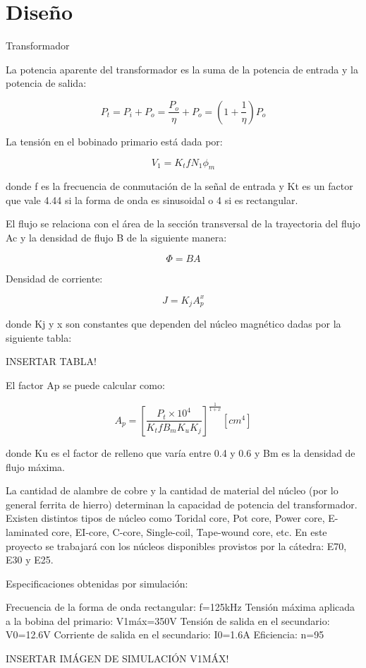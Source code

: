 \section{Diseño}

Transformador

La potencia aparente del transformador es la suma de la potencia de entrada y la potencia de salida:

$$ P_{t}=P_{i}+P_{o}=\frac{P_{o}}{\eta}+P_{o}=(1+\frac{1}{\eta})P_{o} $$

La tensión en el bobinado primario está dada por: 

$$ V_{1}=K_{t} f N_{1} \phi_{m} $$

donde f es la frecuencia de conmutación de la señal de entrada y 
Kt es un factor que vale 4.44 si la forma de onda es sinusoidal o 4 si es rectangular.

El flujo se relaciona con el área de la sección transversal de la trayectoria del flujo Ac y la densidad de flujo B de la siguiente manera:

$$ \Phi=BA $$

Densidad de corriente:

$$ J=K_{j} A_{p}^{x} $$

donde Kj y x son constantes que dependen del núcleo magnético dadas por la siguiente tabla:

INSERTAR TABLA!

El factor Ap se puede calcular como: 

$$ A_{p}=[\frac{P_{t} \times 10^{4}}{K_{t} f B_{m} K_{u} K_{j}}]^{\frac{1}{1+x}} [{cm}^{4}] $$

donde Ku es el factor de relleno que varía entre 0.4 y 0.6 y Bm es la densidad de flujo máxima.

La cantidad de alambre de cobre y la cantidad de material del núcleo (por lo general ferrita de hierro) determinan la capacidad de potencia del transformador. 
Existen distintos tipos de núcleo como Toridal core, Pot core, Power core, E-laminated core, EI-core, C-core, Single-coil, Tape-wound core, etc. 
En este proyecto se trabajará con los núcleos disponibles provistos por la cátedra: E70, E30 y E25.  

Especificaciones obtenidas por simulación:

Frecuencia de la forma de onda rectangular: f=125kHz
Tensión máxima aplicada a la bobina del primario: V1máx=350V
Tensión de salida en el secundario: V0=12.6V
Corriente de salida en el secundario: I0=1.6A
Eficiencia: n=95%

INSERTAR IMÁGEN DE SIMULACIÓN V1MÁX!


